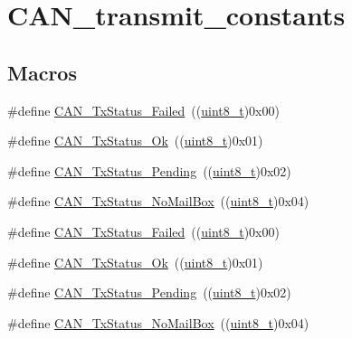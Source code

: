 \hypertarget{group___c_a_n__transmit__constants}{}\section{C\+A\+N\+\_\+transmit\+\_\+constants}
\label{group___c_a_n__transmit__constants}
\subsection*{Macros}
\begin{DoxyCompactItemize}
\item 
\#define \hyperlink{group___c_a_n__transmit__constants_ga8d193002e76c04ec8caff6b110cd5983}{C\+A\+N\+\_\+\+Tx\+Status\+\_\+\+Failed}~((\hyperlink{_p_e___types_8h_aba7bc1797add20fe3efdf37ced1182c5}{uint8\+\_\+t})0x00)
\item 
\#define \hyperlink{group___c_a_n__transmit__constants_ga0b401c61922b1449de9b486dcf475c97}{C\+A\+N\+\_\+\+Tx\+Status\+\_\+\+Ok}~((\hyperlink{_p_e___types_8h_aba7bc1797add20fe3efdf37ced1182c5}{uint8\+\_\+t})0x01)
\item 
\#define \hyperlink{group___c_a_n__transmit__constants_ga9678a3a51379422868083608c7394409}{C\+A\+N\+\_\+\+Tx\+Status\+\_\+\+Pending}~((\hyperlink{_p_e___types_8h_aba7bc1797add20fe3efdf37ced1182c5}{uint8\+\_\+t})0x02)
\item 
\#define \hyperlink{group___c_a_n__transmit__constants_ga2620e99debd51011d3569121f2e44690}{C\+A\+N\+\_\+\+Tx\+Status\+\_\+\+No\+Mail\+Box}~((\hyperlink{_p_e___types_8h_aba7bc1797add20fe3efdf37ced1182c5}{uint8\+\_\+t})0x04)
\item 
\#define \hyperlink{group___c_a_n__transmit__constants_ga8d193002e76c04ec8caff6b110cd5983}{C\+A\+N\+\_\+\+Tx\+Status\+\_\+\+Failed}~((\hyperlink{_p_e___types_8h_aba7bc1797add20fe3efdf37ced1182c5}{uint8\+\_\+t})0x00)
\item 
\#define \hyperlink{group___c_a_n__transmit__constants_ga0b401c61922b1449de9b486dcf475c97}{C\+A\+N\+\_\+\+Tx\+Status\+\_\+\+Ok}~((\hyperlink{_p_e___types_8h_aba7bc1797add20fe3efdf37ced1182c5}{uint8\+\_\+t})0x01)
\item 
\#define \hyperlink{group___c_a_n__transmit__constants_ga9678a3a51379422868083608c7394409}{C\+A\+N\+\_\+\+Tx\+Status\+\_\+\+Pending}~((\hyperlink{_p_e___types_8h_aba7bc1797add20fe3efdf37ced1182c5}{uint8\+\_\+t})0x02)
\item 
\#define \hyperlink{group___c_a_n__transmit__constants_ga2620e99debd51011d3569121f2e44690}{C\+A\+N\+\_\+\+Tx\+Status\+\_\+\+No\+Mail\+Box}~((\hyperlink{_p_e___types_8h_aba7bc1797add20fe3efdf37ced1182c5}{uint8\+\_\+t})0x04)
\end{DoxyCompactItemize}


